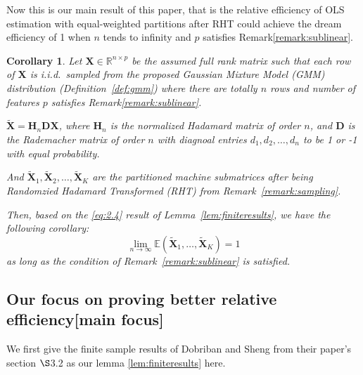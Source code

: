 \documentclass[11pt]{article}
\numberwithin{equation}{section}
\theoremstyle{plain}
\newtheorem{corollary}[theorem]{Corollary}
\theoremstyle{definition}
\theoremstyle{remark}
\begin{document}
Now this is our main result of this paper, that is the relative efficiency of OLS estimation with equal-weighted partitions after RHT could achieve the dream efficiency of 1 when $n$ tends to infinity and $p$ satisfies Remark\ref{remark:sublinear}.
\begin{corollary}
  \label{corollary:main}
  Let $\mathbf{X}\in\mathbb{R}^{n\times p}$ be the assumed full rank matrix such that each row of $\mathbf{X}$ is i.i.d.\ sampled from the proposed Gaussian Mixture Model (GMM) distribution (Definition~\ref{def:gmm}) where there are totally $n$ rows and number of features $p$ satisfies Remark\ref{remark:sublinear}.

  $\mathbf{\tilde{X}} = \mathbf{H}_n\mathbf{D}\mathbf{X}$, where $\mathbf{H}_n$ is the normalized Hadamard matrix of order $n$, and $\mathbf{D}$ is the Rademacher matrix of order $n$ with diagnoal entries $d_1, d_2, \ldots, d_n$ to be 1 or -1 with equal probability.

  And $\mathbf{\tilde{X}}_{1}, \mathbf{\tilde{X}}_{2}, \ldots, \mathbf{\tilde{X}}_{K}$ are the partitioned machine submatrices after being Randomzied Hadamard Transformed (RHT) from Remark~\ref{remark:sampling}.

  Then, based on the \ref{eq:2.4} result of Lemma~\ref{lem:finiteresults}, we have the following corollary:
  \[
    \lim_{n\to\infty}\mathbb{E}(\mathbf{\tilde{X}}_1,\ldots,\mathbf{\tilde{X}}_K) = 1
  \]
  as long as the condition of Remark~\ref{remark:sublinear} is satisfied.
\end{corollary}
\subsection{Our focus on proving better relative efficiency[main focus]}
We first give the finite sample results of Dobriban and Sheng \cite{dobriban2022distributedlinearregressionaveraging} from their paper's section $\S$3.2 as our lemma \ref{lem:finiteresults} here.
\end{document}
